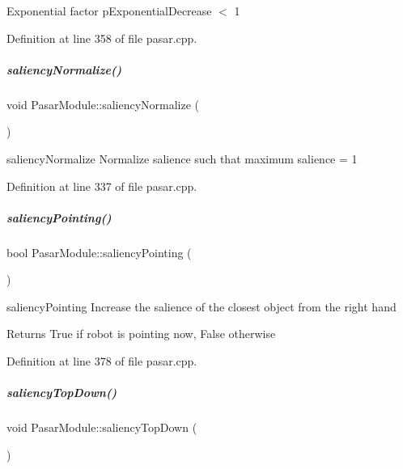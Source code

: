 Exponential factor p\+Exponential\+Decrease $<$ 1 

Definition at line 358 of file pasar.\+cpp.

\mbox{\label{group__pasar_aecae0bd601883938d95be10c5f6990af}} 
\subparagraph{\texorpdfstring{saliency\+Normalize()}{saliencyNormalize()}}
{\footnotesize\ttfamily void Pasar\+Module\+::saliency\+Normalize (\begin{DoxyParamCaption}{ }\end{DoxyParamCaption})\hspace{0.3cm}{\ttfamily [protected]}}



saliency\+Normalize Normalize salience such that maximum salience = 1 



Definition at line 337 of file pasar.\+cpp.

\mbox{\label{group__pasar_a8c64b45d628f72c5a944f1952a5947b0}} 
\subparagraph{\texorpdfstring{saliency\+Pointing()}{saliencyPointing()}}
{\footnotesize\ttfamily bool Pasar\+Module\+::saliency\+Pointing (\begin{DoxyParamCaption}{ }\end{DoxyParamCaption})\hspace{0.3cm}{\ttfamily [protected]}}



saliency\+Pointing Increase the salience of the closest object from the right hand 

\begin{DoxyReturn}{Returns}
True if robot is pointing now, False otherwise 
\end{DoxyReturn}


Definition at line 378 of file pasar.\+cpp.

\mbox{\label{group__pasar_a8b6edeeb377af6f56cf8636c7a5471f3}} 
\subparagraph{\texorpdfstring{saliency\+Top\+Down()}{saliencyTopDown()}}
{\footnotesize\ttfamily void Pasar\+Module\+::saliency\+Top\+Down (\begin{DoxyParamCaption}{ }\end{DoxyParamCaption})\hspace{0.3cm}{\ttfamily [protected]}}



